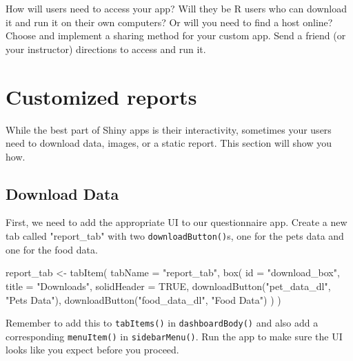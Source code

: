 \documentclass[
  oneside]{book}
\newenvironment{Shaded}{\begin{snugshade}}{\end{snugshade}}
\newcommand{\AttributeTok}[1]{\textcolor[rgb]{0.77,0.63,0.00}{#1}}
\newcommand{\ConstantTok}[1]{\textcolor[rgb]{0.00,0.00,0.00}{#1}}
\newcommand{\FunctionTok}[1]{\textcolor[rgb]{0.00,0.00,0.00}{#1}}
\newcommand{\NormalTok}[1]{#1}
\newcommand{\OtherTok}[1]{\textcolor[rgb]{0.56,0.35,0.01}{#1}}
\newcommand{\StringTok}[1]{\textcolor[rgb]{0.31,0.60,0.02}{#1}}
\begin{document}
How will users need to access your app? Will they be R users who can download it and run it on their own computers? Or will you need to find a host online? Choose and implement a sharing method for your custom app. Send a friend (or your instructor) directions to access and run it.

\hypertarget{reports}{%
\chapter{Customized reports}\label{reports}}

While the best part of Shiny apps is their interactivity, sometimes your users need to download data, images, or a static report. This section will show you how.

\hypertarget{download-data}{%
\section{Download Data}\label{download-data}}

First, we need to add the appropriate UI to our questionnaire app. Create a new tab called \StringTok{"report\_tab"} with two \texttt{downloadButton}\texttt{()}s, one for the pets data and one for the food data.

\begin{Shaded}
\begin{Highlighting}[]
\NormalTok{report\_tab }\OtherTok{\textless{}{-}} \FunctionTok{tabItem}\NormalTok{(}
  \AttributeTok{tabName =} \StringTok{"report\_tab"}\NormalTok{,}
  \FunctionTok{box}\NormalTok{(}
    \AttributeTok{id =} \StringTok{"download\_box"}\NormalTok{,}
    \AttributeTok{title =} \StringTok{"Downloads"}\NormalTok{,}
    \AttributeTok{solidHeader =} \ConstantTok{TRUE}\NormalTok{,}
    \FunctionTok{downloadButton}\NormalTok{(}\StringTok{"pet\_data\_dl"}\NormalTok{, }\StringTok{"Pets Data"}\NormalTok{),}
    \FunctionTok{downloadButton}\NormalTok{(}\StringTok{"food\_data\_dl"}\NormalTok{, }\StringTok{"Food Data"}\NormalTok{)}
\NormalTok{  )}
\NormalTok{)}
\end{Highlighting}
\end{Shaded}

\begin{warning}
Remember to add this to \texttt{tabItems}\texttt{()} in \texttt{dashboardBody}\texttt{()} and also add a corresponding \texttt{menuItem}\texttt{()} in \texttt{sidebarMenu}\texttt{()}. Run the app to make sure the UI looks like you expect before you proceed.

\end{warning}
\end{document}
